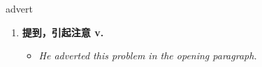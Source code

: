 
\begin{frame}
{\huge advert}
\begin{center}
\begin{enumerate}\Large
  \item \textbf{提到，引起注意 v.}
  \begin{itemize}
    \item \em{\Large{He adverted this problem in the opening paragraph.}}
  \end{itemize}
\end{enumerate}
\end{center}
\end{frame}
